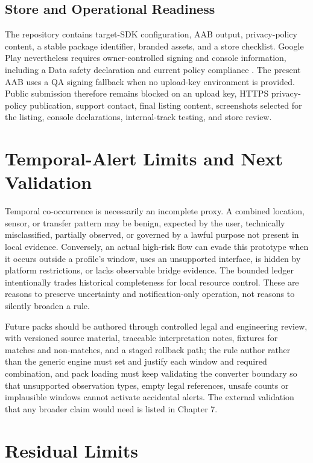 \subsection{Store and Operational Readiness}

The repository contains target-SDK configuration, AAB output, privacy-policy content, a stable package identifier, branded assets, and a store checklist. Google Play nevertheless requires owner-controlled signing and console information, including a Data safety declaration and current policy compliance \cite{playDataSafety,playTargetApiLevel}. The present AAB uses a QA signing fallback when no upload-key environment is provided. Public submission therefore remains blocked on an upload key, HTTPS privacy-policy publication, support contact, final listing content, screenshots selected for the listing, console declarations, internal-track testing, and store review.

\section{Temporal-Alert Limits and Next Validation}

Temporal co-occurrence is necessarily an incomplete proxy. A combined location, sensor, or transfer pattern may be benign, expected by the user, technically misclassified, partially observed, or governed by a lawful purpose not present in local evidence. Conversely, an actual high-risk flow can evade this prototype when it occurs outside a profile's window, uses an unsupported interface, is hidden by platform restrictions, or lacks observable bridge evidence. The bounded ledger intentionally trades historical completeness for local resource control. These are reasons to preserve uncertainty and notification-only operation, not reasons to silently broaden a rule.

Future packs should be authored through controlled legal and engineering review, with versioned source material, traceable interpretation notes, fixtures for matches and non-matches, and a staged rollback path; the rule author rather than the generic engine must set and justify each window and required combination, and pack loading must keep validating the converter boundary so that unsupported observation types, empty legal references, unsafe counts or implausible windows cannot activate accidental alerts. The external validation that any broader claim would need is listed in Chapter 7.

\section{Residual Limits}

